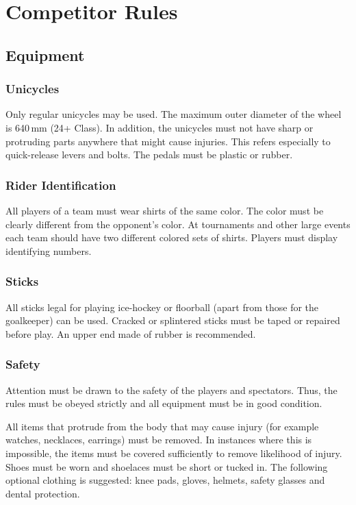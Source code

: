 \chapter{Competitor Rules}

\section{Equipment}
\subsection{Unicycles}
Only regular unicycles may be used.
The maximum outer diameter of the wheel is 640\,mm (24+ Class).
In addition, the unicycles must not have sharp or protruding parts anywhere that might cause injuries.
This refers especially to quick-release levers and bolts.
The pedals must be plastic or rubber.

\subsection{Rider Identification}
All players of a team must wear shirts of the same color.
The color must be clearly different from the opponent's color.
At tournaments and other large events each team should have two different colored sets of shirts.
Players must display identifying numbers.

\subsection{Sticks}
All sticks legal for playing ice-hockey or floorball (apart from those for the goalkeeper) can be used.
Cracked or splintered sticks must be taped or repaired before play.
An upper end made of rubber is recommended.

\subsection{Safety}
Attention must be drawn to the safety of the players and spectators.
Thus, the rules must be obeyed strictly and all equipment must be in good condition.

All items that protrude from the body that may cause injury (for example watches, necklaces, earrings) must be removed.
In instances where this is impossible, the items must be covered sufficiently to remove likelihood of injury.
Shoes must be worn and shoelaces must be short or tucked in.
The following optional clothing is suggested: knee pads, gloves, helmets, safety glasses and dental protection.

